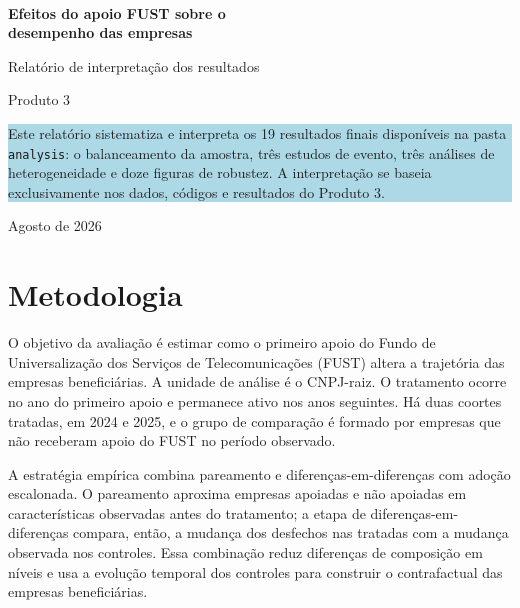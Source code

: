 \documentclass[12pt,a4paper]{article}
\begin{document}
\hypersetup{pageanchor=false}

\begin{titlepage}
  \thispagestyle{empty}
  \vspace*{2.2cm}
  \noindent{\color{bndesgreen}\rule{\textwidth}{4pt}}\\[1.1cm]
  {\Huge\bfseries\color{bndesblue} Efeitos do apoio FUST sobre o\\[0.2em] desempenho das empresas\par}
  \vspace{0.8cm}
  {\Large Relatório de interpretação dos resultados\par}
  \vspace{0.35cm}
  {\large Produto 3\par}
  \vfill
  \begin{minipage}{0.88\textwidth}
    \colorbox{lightblue}{\parbox{0.83\textwidth}{
      Este relatório sistematiza e interpreta os 19 resultados finais disponíveis na pasta
      \texttt{analysis}: o balanceamento da amostra, três estudos de evento, três análises de
      heterogeneidade e doze figuras de robustez. A interpretação se baseia exclusivamente nos
      dados, códigos e resultados do Produto 3.
    }}
  \end{minipage}
  \vfill
  {\large Agosto de 2026\par}
  \vspace{1cm}
  \noindent{\color{bndesblue}\rule{\textwidth}{1.2pt}}
\end{titlepage}

\hypersetup{pageanchor=true}
\tableofcontents
\clearpage
{}

\section{Metodologia}

O objetivo da avaliação é estimar como o primeiro apoio do Fundo de Universalização dos
Serviços de Telecomunicações (FUST) altera a trajetória das empresas beneficiárias. A unidade
de análise é o CNPJ-raiz. O tratamento ocorre no ano do primeiro apoio e permanece ativo nos
anos seguintes. Há duas coortes tratadas, em 2024 e 2025, e o grupo de comparação é formado por
empresas que não receberam apoio do FUST no período observado.

A estratégia empírica combina pareamento e diferenças-em-diferenças com adoção escalonada. O
pareamento aproxima empresas apoiadas e não apoiadas em características observadas antes do
tratamento; a etapa de diferenças-em-diferenças compara, então, a mudança dos desfechos nas
tratadas com a mudança observada nos controles. Essa combinação reduz diferenças de composição
em níveis e usa a evolução temporal dos controles para construir o contrafactual das empresas
beneficiárias.
\end{document}
